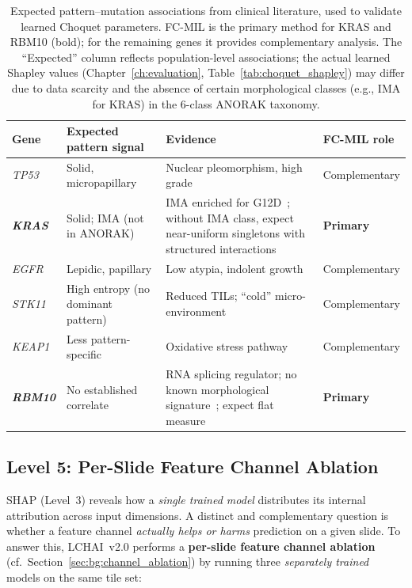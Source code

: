 \begin{table}[ht!]
\centering
\small
\caption[Expected pattern--mutation associations from clinical
literature.]{Expected pattern--mutation associations from clinical
literature, used to validate learned Choquet parameters.
FC-MIL is the primary method for KRAS and RBM10 (bold);
for the remaining genes it provides complementary analysis.
The ``Expected'' column reflects population-level associations;
the actual learned Shapley values
(Chapter~\ref{ch:evaluation}, Table~\ref{tab:choquet_shapley}) may
differ due to data scarcity and the absence of certain morphological
classes (e.g., IMA for KRAS) in the 6-class ANORAK taxonomy.}
\label{tab:expected_associations}
\begin{tabular}{p{1.4cm} p{4.2cm} p{5.5cm} p{2.5cm}}
\hline
\textbf{Gene} & \textbf{Expected pattern signal} &
\textbf{Evidence} & \textbf{FC-MIL role} \\
\hline
\textit{TP53}  & Solid, micropapillary &
  Nuclear pleomorphism, high grade~\cite{ahn2022tp53highgrade} &
  Complementary \\
\textbf{\textit{KRAS}}  & Solid; IMA (not in ANORAK) &
  IMA enriched for G12D~\cite{shim2015krasmucinous};
  without IMA class, expect near-uniform singletons with
  structured interactions &
  \textbf{Primary} \\
\textit{EGFR}  & Lepidic, papillary &
  Low atypia, indolent growth~\cite{yoshizawa2013egfrmorph} &
  Complementary \\
\textit{STK11} & High entropy (no dominant pattern) &
  Reduced TILs; ``cold'' micro-environment~\cite{skoulidis2015krassubsets,skoulidis2018stk11pd1} &
  Complementary \\
\textit{KEAP1} & Less pattern-specific~\cite{li2011keap1papillary} &
  Oxidative stress pathway~\cite{tcga2014luad} &
  Complementary \\
\textbf{\textit{RBM10}} & No established correlate &
  RNA splicing regulator; no known morphological
  signature~\cite{tcga2014luad}; expect flat measure &
  \textbf{Primary} \\
\hline
\end{tabular}
\end{table}

\subsection{Level 5: Per-Slide Feature Channel Ablation}
\label{sec:meth:interp:ablation}

SHAP (Level~3) reveals how a \emph{single trained model} distributes
its internal attribution across input dimensions.
A distinct and complementary question is whether a feature channel
\emph{actually helps or harms} prediction on a given slide.
To answer this, LCHAI~v2.0 performs a \textbf{per-slide feature
channel ablation} (cf.\ Section~\ref{sec:bg:channel_ablation}) by
running three \emph{separately trained} models on the same tile set:

